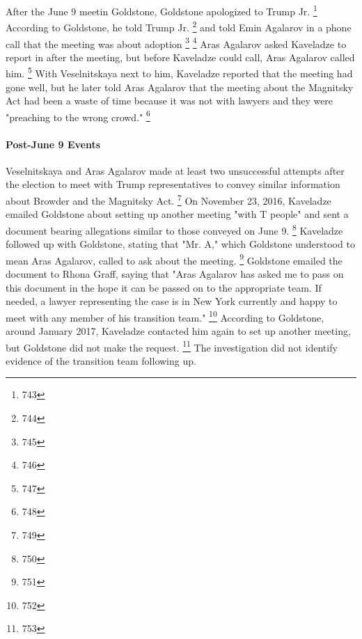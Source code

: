 After the June 9 meetin Goldstone, Goldstone apologized to Trump Jr.%
\footnote{743}
According to Goldstone, he told Trump Jr.
\footnote{744}
and told Emin Agalarov in a phone call that the meeting was about adoption
\footnote{745}
\footnote{746}
Aras Agalarov asked Kaveladze to report in after the meeting, but before Kaveladze could call, Aras Agalarov called him.%
\footnote{747}
With Veselnitskaya next to him, Kaveladze reported that the meeting had gone well, but he later told Aras Agalarov that the meeting about the Magnitsky Act had been a waste of time because it was not with lawyers and they were "preaching to the wrong crowd."%
\footnote{748}

\paragraph{Post-June 9 Events}

Veselnitskaya and Aras Agalarov made at least two unsuccessful attempts after the election to meet with Trump representatives to convey similar information about Browder and the Magnitsky Act.%
\footnote{749}
On November 23, 2016, Kaveladze emailed Goldstone about setting up another meeting "with T people" and sent a document bearing allegations similar to those conveyed on June 9.%
\footnote{750}
Kaveladze followed up with Goldstone, stating that "Mr. A," which Goldstone understood to mean Aras Agalarov, called to ask about the meeting.%
\footnote{751}
Goldstone emailed the document to Rhona Graff, saying that "Aras Agalarov has asked me to pass on this document in the hope it can be passed on to the appropriate team.
If needed, a lawyer representing the case is in New York currently and happy to meet with any member of his transition team."%
\footnote{752}
According to Goldstone, around January 2017, Kaveladze contacted him again to set up another meeting, but Goldstone did not make the request.%
\footnote{753}
The investigation did not identify evidence of the transition team following up.

